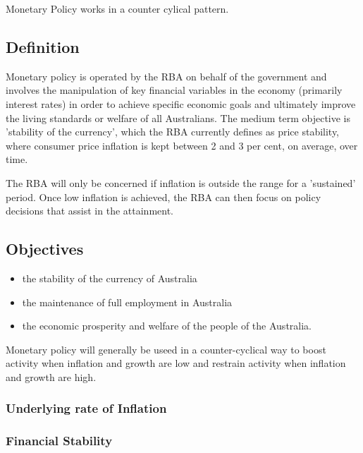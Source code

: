 \documentclass[11pt]{article}
\begin{document}
Monetary Policy works in a counter cylical pattern.

\subsection{Definition}
\label{sec-3-2}

Monetary policy is operated by the RBA on behalf of the government and
involves the manipulation of key financial variables in the economy
(primarily interest rates) in order to achieve specific economic goals
and ultimately improve the living standards or welfare of all
Australians. The medium term objective is 'stability of the
currency', which the RBA currently defines as price stability, where
consumer price inflation is kept between 2 and 3 per cent, on average,
over time.

The RBA will only be concerned if inflation is outside the range for a
'sustained' period. Once low inflation is achieved, the RBA can then
focus on policy decisions that assist in the attainment.

\subsection{Objectives}
\label{sec-3-3}

\begin{itemize}
\item the stability of the currency of Australia
\item the maintenance of full employment in Australia
\item the economic prosperity and welfare of the people of the Australia.
\end{itemize}

Monetary policy will generally be useed in a counter-cyclical way to
boost activity when inflation and growth are low and restrain activity
when inflation and growth are high.

\subsubsection{Underlying rate of Inflation}
\label{sec-3-3-1}



\subsubsection{Financial Stability}
\label{sec-3-3-2}
\end{document}
